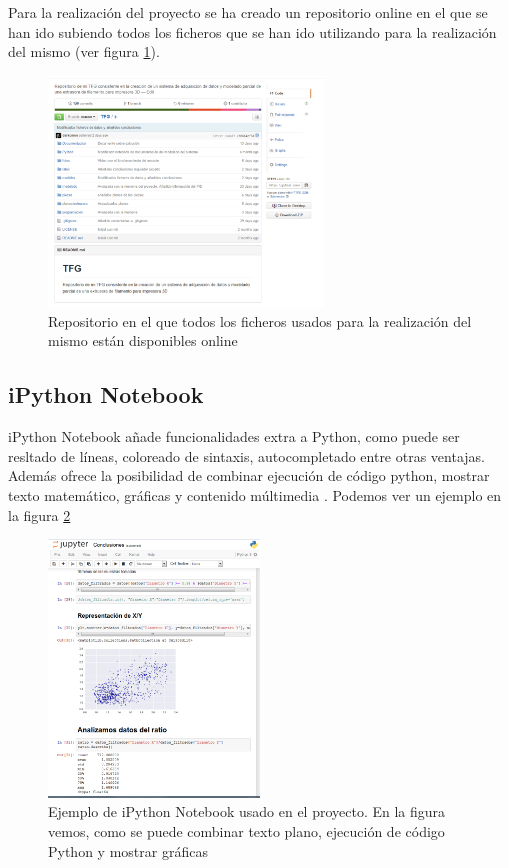 Para la realización del proyecto se ha creado un repositorio online \cite{githubTFG} en el que se han ido subiendo todos los ficheros que se han ido utilizando para la realización del mismo (ver figura \ref{fig:github}).

\begin{figure}[H]
    \centering
    \includegraphics[width=0.65\textwidth]{images/github.png}
    \caption[Repositorio online del proyecto.]{Repositorio  en el que todos los ficheros usados para la realización del mismo están disponibles online}
    \label{fig:github}
\end{figure}


\subsection{iPython Notebook}
iPython Notebook añade funcionalidades extra a Python, como puede ser resltado de líneas, coloreado de sintaxis, autocompletado entre otras ventajas. Además ofrece la posibilidad de combinar ejecución de código python, mostrar texto matemático, gráficas y contenido múltimedia \cite{ipython}. Podemos ver un ejemplo en la figura \ref{fig:ipython}

\begin{figure}[H]
    \centering
    \includegraphics[width=0.5\textwidth]{images/ipython.png}
    \caption[Ejemplo de iPython Notebook usado en el proyecto.]{Ejemplo de iPython Notebook usado en el proyecto. En la figura vemos, como se puede combinar texto plano, ejecución de código Python y mostrar gráficas}
    \label{fig:ipython}
\end{figure}

